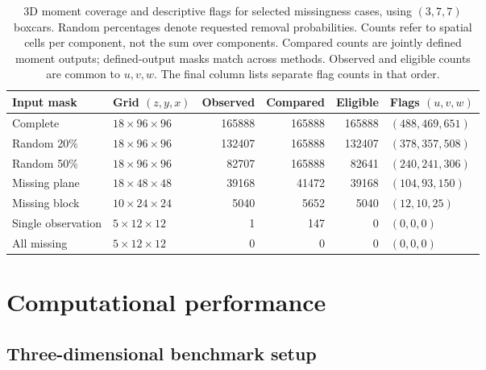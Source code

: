 \documentclass[a4paper,fleqn]{cas-sc}
\begin{document}
\begin{table}[htbp]
	\centering
	\caption{3D moment coverage and descriptive flags for selected missingness cases, using $(3,7,7)$ boxcars. Random percentages denote requested removal probabilities. Counts refer to spatial cells per component, not the sum over components. Compared counts are jointly defined moment outputs; defined-output masks match across methods. Observed and eligible counts are common to $u,v,w$. The final column lists separate flag counts in that order.}
	\label{tab:wind_coverage_flags}
	\small
	\setlength{\tabcolsep}{4pt}
	\begin{tabular}{@{}llrrrl@{}}
		\toprule
		Input mask & Grid $(z,y,x)$ & Observed & Compared & Eligible & Flags $(u,v,w)$ \\
		\midrule
		Complete & $18\times96\times96$ & 165888 & 165888 & 165888 & $(488,469,651)$ \\
		Random 20\% & $18\times96\times96$ & 132407 & 165888 & 132407 & $(378,357,508)$ \\
		Random 50\% & $18\times96\times96$ & 82707 & 165888 & 82641 & $(240,241,306)$ \\
		Missing plane & $18\times48\times48$ & 39168 & 41472 & 39168 & $(104,93,150)$ \\
		Missing block & $10\times24\times24$ & 5040 & 5652 & 5040 & $(12,10,25)$ \\
		Single observation & $5\times12\times12$ & 1 & 147 & 0 & $(0,0,0)$ \\
		All missing & $5\times12\times12$ & 0 & 0 & 0 & $(0,0,0)$ \\
		\bottomrule
	\end{tabular}
\end{table}

\FloatBarrier
\section{Computational performance}
\label{sec:performance}

\subsection{Three-dimensional benchmark setup}
\label{sec:benchmark_setup}
\end{document}
